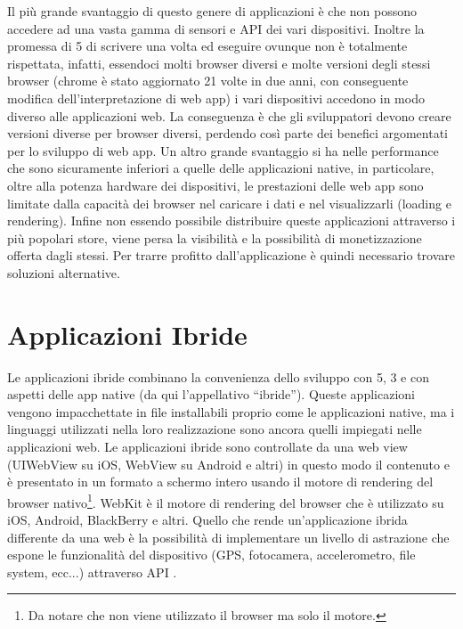         Il più grande svantaggio di questo genere di applicazioni è che non
        possono accedere ad una vasta gamma di sensori e API dei vari
        dispositivi. Inoltre la promessa di \html{}5 di scrivere una volta ed eseguire
        ovunque non è totalmente rispettata, infatti, essendoci molti \mbox{browser}
        diversi e molte versioni degli stessi \mbox{browser} (chrome è stato aggiornato
        21 volte in due anni, con conseguente modifica dell'interpretazione di
        web app\citep{White:Native-vs-Html}) i vari dispositivi accedono in modo
        diverso alle applicazioni web. La conseguenza è che gli sviluppatori
        devono creare versioni diverse per \mbox{browser} diversi, perdendo così
        parte dei benefici argomentati per lo sviluppo di web app. Un
        altro grande svantaggio si ha nelle performance che sono sicuramente
        inferiori a quelle delle applicazioni native, in particolare, oltre
        alla potenza hardware dei dispositivi, le prestazioni delle web app
        sono limitate dalla capacità dei \mbox{browser} nel
        caricare i dati e nel visualizzarli (load\-ing e ren\-der\-ing). Infine non
        essendo possibile distribuire queste applicazioni attraverso i più
        popolari \mbox{store}, viene persa la visibilità e la possibilità di
        monetizzazione offerta dagli stessi. Per trarre profitto
        dall'applicazione è quindi necessario trovare soluzioni alternative.

    \section{Applicazioni Ibride}
        Le applicazioni ibride combinano la convenienza dello sviluppo con
        \html{}5,
        \css{}3 e \js{} con aspetti delle app native (da qui l'appellativo
        ``ibride''). Queste applicazioni vengono impacchettate in file
        installabili proprio come le applicazioni native, ma i linguaggi
        utilizzati nella loro realizzazione sono ancora quelli impiegati nelle
        applicazioni web. Le applicazioni ibride sono controllate da una web
        view (UIWebView su iOS, WebView su Android e altri) in questo modo il
        contenuto \js{} e \html{} è  presentato in un formato a schermo
        intero usando il motore di ren\-der\-ing del \mbox{browser} nativo\footnote{Da
        notare che non viene utilizzato il \mbox{browser} ma solo il motore.}. WebKit è
        il motore di ren\-der\-ing del \mbox{browser} che è utilizzato su iOS, Android,
        BlackBerry e altri. Quello che rende un'applicazione ibrida differente
        da una web è la possibilità di implementare un livello di astrazione
        che espone le funzionalità del dispositivo (GPS, fotocamera,
        accelerometro, file sys\-tem, ecc...) attraverso API \js{}.

